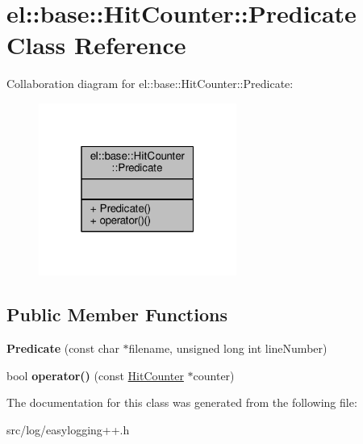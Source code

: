 \hypertarget{classel_1_1base_1_1HitCounter_1_1Predicate}{}\section{el\+:\+:base\+:\+:Hit\+Counter\+:\+:Predicate Class Reference}
\label{classel_1_1base_1_1HitCounter_1_1Predicate}


Collaboration diagram for el\+:\+:base\+:\+:Hit\+Counter\+:\+:Predicate\+:
\nopagebreak
\begin{figure}[H]
\begin{center}
\leavevmode
\includegraphics[width=184pt]{d2/d59/classel_1_1base_1_1HitCounter_1_1Predicate__coll__graph}
\end{center}
\end{figure}
\subsection*{Public Member Functions}
\begin{DoxyCompactItemize}
\item 
{\bfseries Predicate} (const char $\ast$filename, unsigned long int line\+Number)\hypertarget{classel_1_1base_1_1HitCounter_1_1Predicate_ab35f4f7da40df5a788c3984d097bb38c}{}\label{classel_1_1base_1_1HitCounter_1_1Predicate_ab35f4f7da40df5a788c3984d097bb38c}

\item 
bool {\bfseries operator()} (const \hyperlink{classel_1_1base_1_1HitCounter}{Hit\+Counter} $\ast$counter)\hypertarget{classel_1_1base_1_1HitCounter_1_1Predicate_ae07b1562a3c0ed38457401e60b80b0c5}{}\label{classel_1_1base_1_1HitCounter_1_1Predicate_ae07b1562a3c0ed38457401e60b80b0c5}

\end{DoxyCompactItemize}


The documentation for this class was generated from the following file\+:\begin{DoxyCompactItemize}
\item 
src/log/easylogging++.\+h\end{DoxyCompactItemize}
